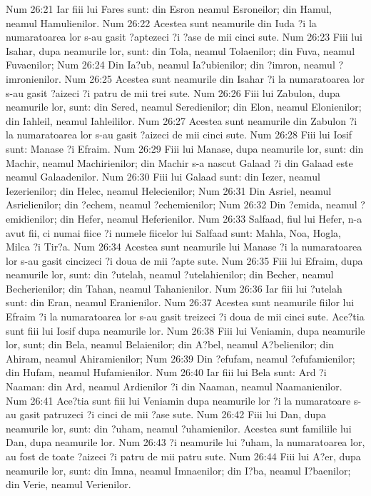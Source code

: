 Num 26:21  Iar fiii lui Fares sunt: din Esron neamul Esroneilor; din Hamul, neamul Hamulienilor.
Num 26:22  Acestea sunt neamurile din Iuda ?i la numaratoarea lor s-au gasit ?aptezeci ?i ?ase de mii cinci sute.
Num 26:23  Fiii lui Isahar, dupa neamurile lor, sunt: din Tola, neamul Tolaenilor; din Fuva, neamul Fuvaenilor;
Num 26:24  Din Ia?ub, neamul Ia?ubienilor; din ?imron, neamul ?imronienilor.
Num 26:25  Acestea sunt neamurile din Isahar ?i la numaratoarea lor s-au gasit ?aizeci ?i patru de mii trei sute.
Num 26:26  Fiii lui Zabulon, dupa neamurile lor, sunt: din Sered, neamul Seredienilor; din Elon, neamul Elonienilor; din Iahleil, neamul Iahleililor.
Num 26:27  Acestea sunt neamurile din Zabulon ?i la numaratoarea lor s-au gasit ?aizeci de mii cinci sute.
Num 26:28  Fiii lui Iosif sunt: Manase ?i Efraim.
Num 26:29  Fiii lui Manase, dupa neamurile lor, sunt: din Machir, neamul Machirienilor; din Machir s-a nascut Galaad ?i din Galaad este neamul Galaadenilor.
Num 26:30  Fiii lui Galaad sunt: din Iezer, neamul Iezerienilor; din Helec, neamul Helecienilor;
Num 26:31  Din Asriel, neamul Asrielienilor; din ?echem, neamul ?echemienilor;
Num 26:32  Din ?emida, neamul ?emidienilor; din Hefer, neamul Heferienilor.
Num 26:33  Salfaad, fiul lui Hefer, n-a avut fii, ci numai fiice ?i numele fiicelor lui Salfaad sunt: Mahla, Noa, Hogla, Milca ?i Tir?a.
Num 26:34  Acestea sunt neamurile lui Manase ?i la numaratoarea lor s-au gasit cincizeci ?i doua de mii ?apte sute.
Num 26:35  Fiii lui Efraim, dupa neamurile lor, sunt: din ?utelah, neamul ?utelahienilor; din Becher, neamul Becherienilor; din Tahan, neamul Tahanienilor.
Num 26:36  Iar fiii lui ?utelah sunt: din Eran, neamul Eranienilor.
Num 26:37  Acestea sunt neamurile fiilor lui Efraim ?i la numaratoarea lor s-au gasit treizeci ?i doua de mii cinci sute. Ace?tia sunt fiii lui Iosif dupa neamurile lor.
Num 26:38  Fiii lui Veniamin, dupa neamurile lor, sunt; din Bela, neamul Belaienilor; din A?bel, neamul A?belienilor; din Ahiram, neamul Ahiramienilor;
Num 26:39  Din ?efufam, neamul ?efufamienilor; din Hufam, neamul Hufamienilor.
Num 26:40  Iar fiii lui Bela sunt: Ard ?i Naaman: din Ard, neamul Ardienilor ?i din Naaman, neamul Naamanienilor.
Num 26:41  Ace?tia sunt fiii lui Veniamin dupa neamurile lor ?i la numaratoare s-au gasit patruzeci ?i cinci de mii ?ase sute.
Num 26:42  Fiii lui Dan, dupa neamurile lor, sunt: din ?uham, neamul ?uhamienilor. Acestea sunt familiile lui Dan, dupa neamurile lor.
Num 26:43  ?i neamurile lui ?uham, la numaratoarea lor, au fost de toate ?aizeci ?i patru de mii patru sute.
Num 26:44  Fiii lui A?er, dupa neamurile lor, sunt: din Imna, neamul Imnaenilor; din I?ba, neamul I?baenilor; din Verie, neamul Verienilor.
